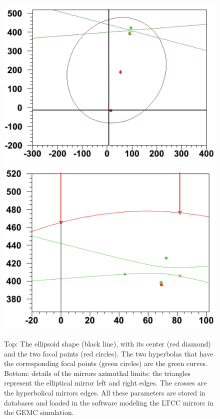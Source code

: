 \begin{figure}
	\centering
	\includegraphics[width=0.95\columnwidth,keepaspectratio]{img/mirrorMath1.png}
	\includegraphics[width=0.95\columnwidth,keepaspectratio]{img/mirrorMath2.png}
	\caption{Top: The ellipsoid shape (black line), with its center (red diamond) and the two focal points (red circles). The two hyperbolas
			   that have the corresponding focal points (green circles) are the green curves. Bottom: details of the mirrors azimuthal limits: the triangles represent
            the elliptical mirror left and right edges. The crosses are the hyperbolical mirrors edges. All these parameters are stored in databases and
            loaded in the software modeling the LTCC mirrors in the GEMC simulation.}
	\label{fig:mirrorMath}
\end{figure}

